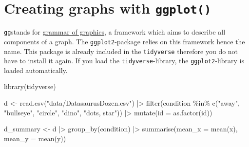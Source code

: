 \documentclass[
  letterpaper,
  DIV=11,
  numbers=noendperiod,
  oneside]{scrreprt}
\newenvironment{Shaded}{\begin{snugshade}}{\end{snugshade}}
\newcommand{\AttributeTok}[1]{\textcolor[rgb]{0.40,0.45,0.13}{#1}}
\newcommand{\FunctionTok}[1]{\textcolor[rgb]{0.28,0.35,0.67}{#1}}
\newcommand{\NormalTok}[1]{\textcolor[rgb]{0.00,0.23,0.31}{#1}}
\newcommand{\OtherTok}[1]{\textcolor[rgb]{0.00,0.23,0.31}{#1}}
\newcommand{\SpecialCharTok}[1]{\textcolor[rgb]{0.37,0.37,0.37}{#1}}
\newcommand{\StringTok}[1]{\textcolor[rgb]{0.13,0.47,0.30}{#1}}
\begin{document}
\hfill\break

\hypertarget{creating-graphs-with-ggplot}{%
\section{\texorpdfstring{Creating graphs with
\texttt{ggplot()}}{Creating graphs with ggplot()}}\label{creating-graphs-with-ggplot}}

\texttt{gg}stands for
\href{https://link.springer.com/book/10.1007/0-387-28695-0}{grammar of
graphics}, a framework which aims to describe all components of a graph.
The \texttt{ggplot2}-package relies on this framework hence the name.
This package is already included in the \texttt{tidyverse} therefore you
do not have to install it again. If you load the
\texttt{tidyverse}-library, the \texttt{ggplot2}-library is loaded
automatically.


\begin{Shaded}
\begin{Highlighting}[]
\FunctionTok{library}\NormalTok{(tidyverse)}

\NormalTok{d }\OtherTok{\textless{}{-}} \FunctionTok{read.csv}\NormalTok{(}\StringTok{"data/DatasaurusDozen.csv"}\NormalTok{) }\SpecialCharTok{|\textgreater{}}
    \FunctionTok{filter}\NormalTok{(condition }\SpecialCharTok{\%in\%} \FunctionTok{c}\NormalTok{(}\StringTok{"away"}\NormalTok{, }\StringTok{"bullseye"}\NormalTok{, }\StringTok{"circle"}\NormalTok{, }\StringTok{"dino"}\NormalTok{, }\StringTok{"dots, star"}\NormalTok{)) }\SpecialCharTok{|\textgreater{}}
    \FunctionTok{mutate}\NormalTok{(}\AttributeTok{id =} \FunctionTok{as.factor}\NormalTok{(id))}

\NormalTok{d\_summary }\OtherTok{\textless{}{-}}\NormalTok{ d }\SpecialCharTok{|\textgreater{}} \FunctionTok{group\_by}\NormalTok{(condition) }\SpecialCharTok{|\textgreater{}}
    \FunctionTok{summarise}\NormalTok{(}\AttributeTok{mean\_x =} \FunctionTok{mean}\NormalTok{(x),}
              \AttributeTok{mean\_y =} \FunctionTok{mean}\NormalTok{(y))}
\end{Highlighting}
\end{Shaded}

\end{document}
